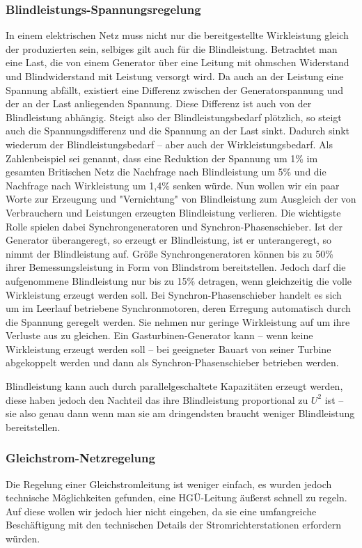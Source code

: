 \subsubsection{Blindleistungs-Spannungsregelung}
In einem elektrischen Netz muss nicht nur die bereitgestellte Wirkleistung gleich der produzierten sein, selbiges gilt auch für die Blindleistung.
Betrachtet man eine Last, die von einem Generator über eine Leitung mit ohmschen Widerstand und Blindwiderstand mit Leistung versorgt wird. Da auch an der Leistung eine Spannung abfällt, existiert eine Differenz zwischen der Generatorspannung und der an der Last anliegenden Spannung. Diese Differenz ist auch von der Blindleistung abhängig. Steigt also der Blindleistungsbedarf plötzlich, so steigt auch die Spannungsdifferenz und die Spannung an der Last sinkt. Dadurch sinkt wiederum der Blindleistungsbedarf – aber auch der Wirkleistungsbedarf.
Als Zahlenbeispiel sei genannt, dass eine Reduktion der Spannung um 1\% im gesamten Britischen Netz die Nachfrage nach Blindleistung um 5\% und die Nachfrage nach Wirkleistung um 1,4\% senken würde.
Nun wollen wir ein paar Worte zur Erzeugung und "Vernichtung" von Blindleistung zum Ausgleich der von Verbrauchern und Leistungen erzeugten Blindleistung verlieren. Die wichtigste Rolle spielen dabei Synchrongeneratoren und Synchron-Phasenschieber.
Ist der Generator überangeregt, %
so erzeugt er Blindleistung, ist er unterangeregt, so nimmt der Blindleistung auf. Größe Synchrongeneratoren können bis zu 50\% ihrer Bemessungsleistung in Form von Blindstrom bereitstellen. %
Jedoch darf die aufgenommene Blindleistung nur bis zu 15\% detragen, wenn gleichzeitig die volle Wirkleistung erzeugt werden soll.\cite{Harrison}	%
Bei Synchron-Phasenschieber handelt es sich um im Leerlauf betriebene Synchronmotoren, deren Erregung automatisch durch die Spannung geregelt werden. Sie nehmen nur geringe Wirkleistung auf um ihre Verluste aus zu gleichen. Ein Gasturbinen-Generator kann – wenn keine Wirkleistung erzeugt werden soll – bei geeigneter Bauart von seiner Turbine abgekoppelt werden und dann als Synchron-Phasenschieber betrieben werden.\cite{Harrison}

Blindleistung kann auch durch parallelgeschaltete Kapazitäten erzeugt werden, diese haben jedoch den Nachteil das ihre Blindleistung proportional zu $U^2$ ist – sie also genau dann wenn man sie am dringendsten braucht weniger Blindleistung bereitstellen.\cite{Harrison}

\subsubsection{Gleichstrom-Netzregelung}
Die Regelung einer Gleichstromleitung ist weniger einfach, es wurden jedoch technische Möglichkeiten gefunden, eine HGÜ-Leitung äußerst schnell zu regeln. Auf diese wollen wir jedoch hier nicht eingehen, da sie eine umfangreiche Beschäftigung mit den technischen Details der Stromrichterstationen erfordern würden. %
